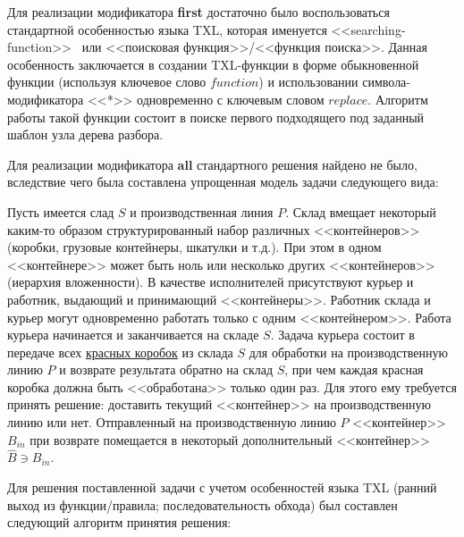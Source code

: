 Для реализации модификатора \textbf{first} достаточно было воспользоваться стандартной особенностью языка TXL, которая именуется <<searching-function>>~\cite{txl-book} или <<поисковая функция>>/<<функция поиска>>.
Данная особенность заключается в создании TXL-функции в форме обыкновенной функции (используя ключевое слово $function$) и использовании символа-модификатора <<*>> одновременно с ключевым словом $replace$.
Алгоритм работы такой функции состоит в поиске первого подходящего под заданный шаблон узла дерева разбора.

Для реализации модификатора \textbf{all} стандартного решения найдено не было, вследствие чего была составлена упрощенная модель задачи следующего вида:

Пусть имеется слад $S$ и производственная линия $P$.
Склад вмещает некоторый каким-то образом структурированный набор различных <<контейнеров>> (коробки, грузовые контейнеры, шкатулки и т.д.).
При этом в одном <<контейнере>> может быть ноль или несколько других <<контейнеров>> (иерархия вложенности).
В качестве исполнителей присутствуют курьер и работник, выдающий и принимающий <<контейнеры>>.
Работник склада и курьер могут одновременно работать только с одним <<контейнером>>.
Работа курьера начинается и заканчивается на складе $S$.
Задача курьера состоит в передаче всех \underline{красных коробок} из склада $S$ для обработки на производственную линию $P$ и возврате результата обратно на склад $S$, при чем каждая красная коробка должна быть <<обработана>> только один раз.
Для этого ему требуется принять решение: доставить текущий <<контейнер>> на производственную линию или нет.
Отправленный на производственную линию $P$ <<контейнер>> $B_{in}$ при возврате помещается в некоторый дополнительный <<контейнер>> $\hat{B} \ni B_{in}$.

Для решения поставленной задачи с учетом особенностей языка TXL (ранний выход из функции/правила; последовательность обхода) был составлен следующий алгоритм принятия решения:

